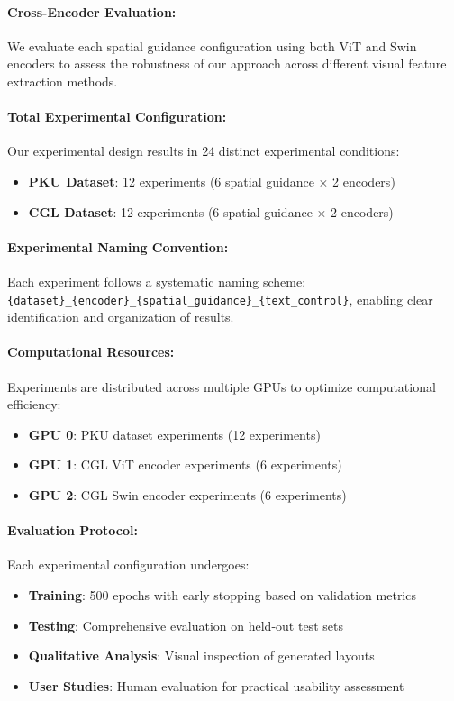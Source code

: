 \documentclass[journal,article,submit,pdftex,moreauthors]{Definitions/mdpi}
\begin{document}
\paragraph{Cross-Encoder Evaluation:}
We evaluate each spatial guidance configuration using both ViT and Swin encoders to assess the robustness of our approach across different visual feature extraction methods.

\paragraph{Total Experimental Configuration:}
Our experimental design results in 24 distinct experimental conditions:
\begin{itemize}
\item \textbf{PKU Dataset}: 12 experiments (6 spatial guidance × 2 encoders)
\item \textbf{CGL Dataset}: 12 experiments (6 spatial guidance × 2 encoders)
\end{itemize}

\paragraph{Experimental Naming Convention:}
Each experiment follows a systematic naming scheme: \texttt{\{dataset\}\_\{encoder\}\_\{spatial\_guidance\}\_\{text\_control\}}, enabling clear identification and organization of results.

\paragraph{Computational Resources:}
Experiments are distributed across multiple GPUs to optimize computational efficiency:
\begin{itemize}
\item \textbf{GPU 0}: PKU dataset experiments (12 experiments)
\item \textbf{GPU 1}: CGL ViT encoder experiments (6 experiments)
\item \textbf{GPU 2}: CGL Swin encoder experiments (6 experiments)
\end{itemize}

\paragraph{Evaluation Protocol:}
Each experimental configuration undergoes:
\begin{itemize}
\item \textbf{Training}: 500 epochs with early stopping based on validation metrics
\item \textbf{Testing}: Comprehensive evaluation on held-out test sets
\item \textbf{Qualitative Analysis}: Visual inspection of generated layouts
\item \textbf{User Studies}: Human evaluation for practical usability assessment
\end{itemize}
\end{document}
